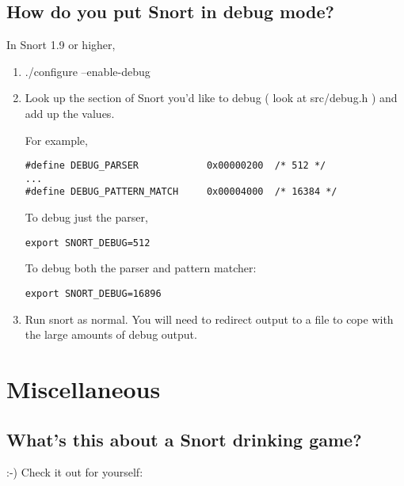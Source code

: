 \documentclass{article}
\begin{document}
\subsection{How do you put Snort in debug mode? }

In Snort 1.9 or higher,

\begin{enumerate}

\item ./configure --enable-debug
\item Look up the section of Snort you'd like to debug ( look at src/debug.h ) and add up the values.

For example, 
\begin{verbatim}
#define DEBUG_PARSER            0x00000200  /* 512 */
...
#define DEBUG_PATTERN_MATCH     0x00004000  /* 16384 */
\end{verbatim}

To debug just the parser, 
\begin{verbatim}
export SNORT_DEBUG=512
\end{verbatim}

To debug both the parser and pattern matcher: 
\begin{verbatim}
export SNORT_DEBUG=16896
\end{verbatim}

\item Run snort as normal.  You will need to redirect output to a file
   to cope with the large amounts of debug output.
\end{enumerate}

\section{Miscellaneous}
\subsection{What's this about a Snort drinking game?}

:-) Check it out for yourself:


\end{document}
